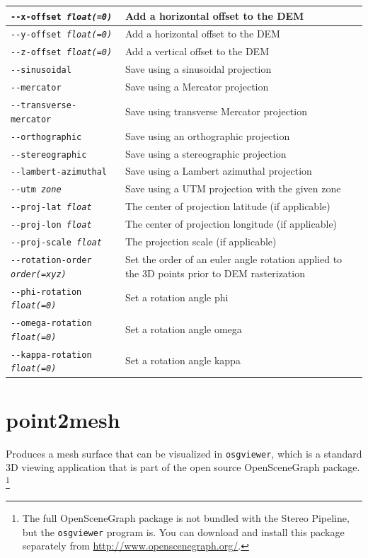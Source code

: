 \begin{longtable}{|l|p{10cm}|}
\texttt{-\/-x-offset \textit{float(=0)}} & Add a horizontal offset to the \ac{DEM} \\ \hline
\texttt{-\/-y-offset \textit{float(=0)}} & Add a horizontal offset to the \ac{DEM} \\ \hline
\texttt{-\/-z-offset \textit{float(=0)}} & Add a vertical offset to the \ac{DEM} \\ \hline
\texttt{-\/-sinusoidal} & Save using a sinusoidal projection \\ \hline
\texttt{-\/-mercator} & Save using a Mercator projection \\ \hline
\texttt{-\/-transverse-mercator} & Save using transverse Mercator projection \\ \hline
\texttt{-\/-orthographic} & Save using an orthographic projection \\ \hline
\texttt{-\/-stereographic} & Save using a stereographic projection \\ \hline
\texttt{-\/-lambert-azimuthal} & Save using a Lambert azimuthal projection \\ \hline
\texttt{-\/-utm \textit{zone}} & Save using a UTM projection with the given zone \\ \hline
\texttt{-\/-proj-lat \textit{float}} & The center of projection latitude (if applicable) \\ \hline
\texttt{-\/-proj-lon \textit{float}} & The center of projection longitude (if applicable) \\ \hline
\texttt{-\/-proj-scale \textit{float}} & The projection scale (if applicable) \\ \hline
\texttt{-\/-rotation-order \textit{order(=xyz)}} & Set the order of an euler angle rotation applied to the 3D points prior to \ac{DEM} rasterization \\ \hline
\texttt{-\/-phi-rotation \textit{float(=0)}} & Set a rotation angle phi \\ \hline
\texttt{-\/-omega-rotation \textit{float(=0)}} & Set a rotation angle omega \\ \hline
\texttt{-\/-kappa-rotation \textit{float(=0)}} & Set a rotation angle kappa \\ \hline
\end{longtable}

\section{point2mesh}
\label{point2mesh}

Produces a mesh surface that can be visualized in {\tt osgviewer},
which is a standard 3D viewing application that is part of the open
source OpenSceneGraph package.  \footnote{The full OpenSceneGraph package
is not bundled with the Stereo Pipeline, but the \texttt{osgviewer} program
is.  You can download and install this package separately from 
\url{http://www.openscenegraph.org/}.}

